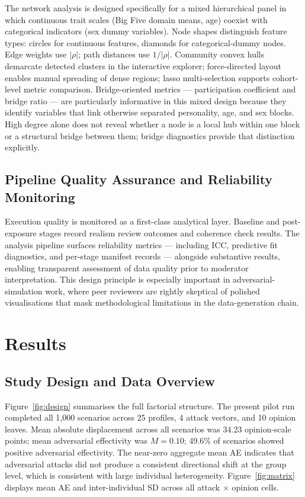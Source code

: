 \documentclass[11pt,a4paper]{article}
\begin{document}
The network analysis is designed specifically for a mixed hierarchical panel in which continuous trait scales (Big Five domain means, age) coexist with categorical indicators (sex dummy variables). Node shapes distinguish feature types: circles for continuous features, diamonds for categorical-dummy nodes. Edge weights use $|\rho|$; path distances use $1/|\rho|$. Community convex hulls demarcate detected clusters in the interactive explorer; force-directed layout enables manual spreading of dense regions; lasso multi-selection supports cohort-level metric comparison. Bridge-oriented metrics --- participation coefficient and bridge ratio --- are particularly informative in this mixed design because they identify variables that link otherwise separated personality, age, and sex blocks. High degree alone does not reveal whether a node is a local hub within one block or a structural bridge between them; bridge diagnostics provide that distinction explicitly.

\subsection{Pipeline Quality Assurance and Reliability Monitoring}

Execution quality is monitored as a first-class analytical layer. Baseline and post-exposure stages record realism review outcomes and coherence check results. The analysis pipeline surfaces reliability metrics --- including ICC, predictive fit diagnostics, and per-stage manifest records --- alongside substantive results, enabling transparent assessment of data quality prior to moderator interpretation. This design principle is especially important in adversarial-simulation work, where peer reviewers are rightly skeptical of polished visualisations that mask methodological limitations in the data-generation chain.

\section{Results}

\subsection{Study Design and Data Overview}

Figure~\ref{fig:design} summarises the full factorial structure. The present pilot run completed all 1{,}000 scenarios across 25 profiles, 4 attack vectors, and 10 opinion leaves. Mean absolute displacement across all scenarios was 34.23 opinion-scale points; mean adversarial effectivity was $M = 0.10$; 49.6\% of scenarios showed positive adversarial effectivity. The near-zero aggregate mean AE indicates that adversarial attacks did not produce a consistent directional shift at the group level, which is consistent with large individual heterogeneity. Figure~\ref{fig:matrix} displays mean AE and inter-individual SD across all attack $\times$ opinion cells.
\end{document}
